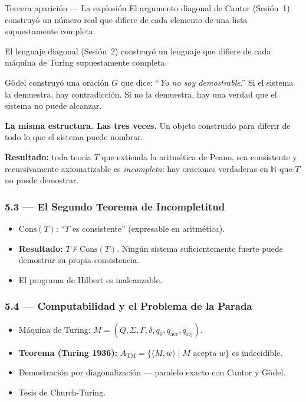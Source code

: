 \documentclass[11pt, letterpaper]{article}
\begin{document}
\begin{diagonal}{Tercera aparici\'on --- La explosi\'on}
El argumento diagonal de Cantor (Sesi\'on~1) construy\'o un n\'umero real que difiere de cada elemento de una lista supuestamente completa.

El lenguaje diagonal (Sesi\'on~2) construy\'o un lenguaje que difiere de cada m\'aquina de Turing supuestamente completa.

G\"odel construy\'o una oraci\'on $G$ que dice: ``\textit{Yo no soy demostrable}.'' Si el sistema la demuestra, hay contradicci\'on. Si no la demuestra, hay una verdad que el sistema no puede alcanzar.

\medskip
\textbf{La misma estructura. Las tres veces.} Un objeto construido para diferir de todo lo que el sistema puede nombrar.

\medskip
\textbf{Resultado:} toda teor\'ia $T$ que extienda la aritm\'etica de Peano, sea consistente y recursivamente axiomatizable es \emph{incompleta}: hay oraciones verdaderas en $\mathbb{N}$ que $T$ no puede demostrar.
\end{diagonal}

\subsubsection{5.3 --- El Segundo Teorema de Incompletitud}
\begin{itemize}
  \item $\text{Cons}(T)$: ``$T$ es consistente'' (expresable en aritm\'etica).
  \item \textbf{Resultado:} $T\not\vdash\text{Cons}(T)$. Ning\'un sistema suficientemente fuerte puede demostrar su propia consistencia.
  \item El programa de Hilbert es inalcanzable.
\end{itemize}

\subsubsection{5.4 --- Computabilidad y el Problema de la Parada}
\begin{itemize}
  \item M\'aquina de Turing: $M=(Q,\Sigma,\Gamma,\delta,q_0,q_\text{acc},q_\text{rej})$.
  \item \textbf{Teorema (Turing 1936):} $A_\text{TM}=\{\langle M,w\rangle\mid M\text{ acepta }w\}$ es indecidible.
  \item Demostraci\'on por diagonalizaci\'on --- paralelo exacto con Cantor y G\"odel.
  \item Tesis de Church-Turing.
\end{itemize}
\end{document}
